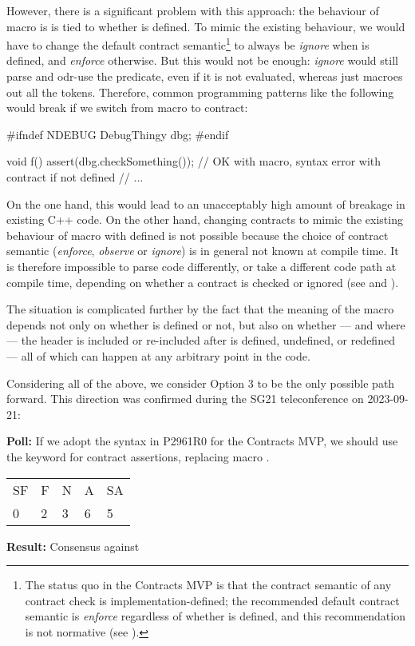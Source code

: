 However, there is a significant problem with this approach: the behaviour of macro  is is tied to whether   is defined. To mimic the existing behaviour, we would have to change the default contract semantic\footnote{The status quo in the Contracts MVP is that the contract semantic of any contract check is implementation-defined; the recommended default contract semantic is \emph{enforce} regardless of whether  is defined, and this recommendation is not normative (see \cite{P2877R0}).} to always be \emph{ignore} when  is defined, and \emph{enforce} otherwise. But this would not be enough: \emph{ignore} would still parse and odr-use the predicate, even if it is not evaluated, whereas  just macroes out all the tokens. Therefore, common programming patterns like the following would break if we switch  from macro to contract:

\begin{codeblock}
#ifndef NDEBUG
  DebugThingy dbg;
#endif

void f() {
  assert(dbg.checkSomething());  // OK with macro, syntax error with contract if  not defined
  // ...
}
\end{codeblock}

On the one hand, this would lead to an unacceptably high amount of breakage in existing C++ code. On the other hand, changing contracts to mimic the existing behaviour of macro  with  defined is not possible because the choice of contract semantic (\emph{enforce}, \emph{observe} or \emph{ignore}) is in general not known at compile time. It is therefore impossible to parse code differently, or take a different code path at compile time, depending on whether a contract is checked or ignored (see \cite{P2877R0} and \cite{P2834R1}).

The situation is complicated further by the fact that the meaning of the  macro depends not only on whether  is defined or not, but also on whether --- and where --- the  header is included or re-included after  is defined, undefined, or redefined --- all of which can happen at any arbitrary point in the code.

Considering all of the above, we consider Option 3 to be the only possible path forward. This direction was confirmed during the SG21 teleconference on 2023-09-21:

\begin{adjustwidth}{0.5cm}{0.5cm}
\textbf{Poll:} If we adopt the syntax in P2961R0 for the Contracts MVP, we should use the keyword  for contract assertions, replacing macro .

\begin{tabular}{lllll}
SF & F & N & A & SA \\
0 & 2 & 3 & 6 & 5
\end{tabular}

\textbf{Result:} Consensus against
\end{adjustwidth}

